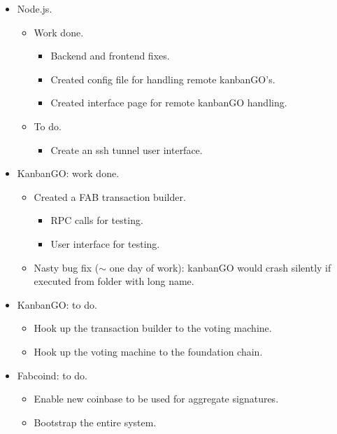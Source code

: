 \begin{frame}
\begin{itemize}
\item Node.js. 
\begin{itemize}
\item Work done.
\begin{itemize}
\item Backend and frontend fixes.
\item Created config file for handling remote kanbanGO's.
\item Created interface page for remote kanbanGO handling.
\end{itemize}
\item To do.
\begin{itemize}
\item Create an ssh tunnel user interface.
\end{itemize}
\end{itemize}
\item KanbanGO: work done.
\begin{itemize}
\item Created a FAB transaction builder.
\begin{itemize}
\item RPC calls for testing.
\item User interface for testing.
\end{itemize}
\item Nasty bug fix ($\sim$ one day of work): kanbanGO would crash silently if executed from folder with long name.
\end{itemize}
\item KanbanGO: to do.
\begin{itemize}
\item Hook up the transaction builder to the voting machine.
\item Hook up the voting machine to the foundation chain.
\end{itemize}
\item Fabcoind: to do.
\begin{itemize}
\item Enable new coinbase to be used for aggregate signatures.
\item Bootstrap the entire system.
\end{itemize}

\end{itemize}
\end{frame}